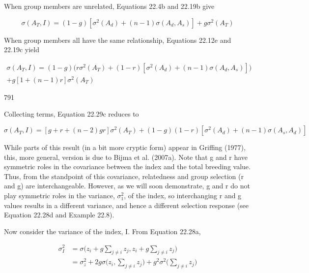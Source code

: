 \documentclass{article}
\begin{document}
When group members are unrelated, Equations 22.4b and 22.19b give

\begin{equation}
\sigma\left(A_{T},I\right)=\left(1-g\right)\left[\sigma^{2}(A_{d})+(n-1)\sigma(A_{d},A_{s})\right]+g\sigma^{2}(A_{T})
\tag{22.29b}
\label{eq:22_29b}
\end{equation}

When group members all have the same relationship, Equations 22.12e and 22.19c yield

\begin{equation}
\begin{align*}\sigma\left(A_{T},I\right)=(1-g)\Biggl(r\sigma^{2}(A_{T})+(1-r)\left[\sigma^{2}(A_{d})+(n-1)\sigma(A_{d},A_{s})\right]\Biggr)\\+g\left[1+(n-1)r\right]\sigma^{2}(A_{T})\end{align*}
\tag{22.29c}
\label{eq:22_29c}
\end{equation}

791

Collecting terms, Equation 22.29c reduces to

\begin{equation}
\sigma(A_{T},I)=\left[g+r+(n-2)g r\right]\sigma^{2}(A_{T})+(1-g)(1-r)\left[\sigma^{2}(A_{d})+(n-1)\sigma(A_{s},A_{d})\right]
\tag{22.29d}
\label{eq:22_29d}
\end{equation}

While parts of this result (in a bit more cryptic form) appear in Griffing (1977), this, more general, version is due to Bijma et al. (2007a). Note that g and r have symmetric roles in the covariance between the index and the total breeding value. Thus, from the standpoint of this covariance, relatedness and group selection (r and g) are interchangeable. However, as we will soon demonstrate, g and r do not play symmetric roles in the variance,  $ \sigma_{1}^{2} $, of the index, so interchanging r and g values results in a different variance, and hence a different selection response (see Equation 22.28d and Example 22.8).

Now consider the variance of the index, I. From Equation 22.28a,

\begin{equation}
\begin{aligned}\sigma_{I}^{2}&=\sigma\Big(z_{i}+g\sum_{j\neq i}z_{j},z_{i}+g\sum_{j\neq i}z_{j}\Big)\\&=\sigma_{z}^{2}+2g\sigma\Big(z_{i},\sum_{j\neq i}z_{j}\Big)+g^{2}\sigma^{2}\Big(\sum_{j\neq i}z_{j}\Big)\end{aligned}
\tag{22.30a}
\label{eq:22_30a}
\end{equation}
\end{document}
